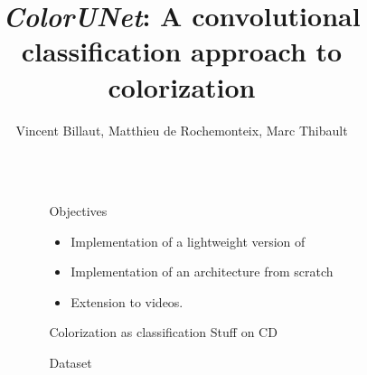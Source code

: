 \documentclass[final]{beamer}
\title{\textit{ColorUNet}: A convolutional classification approach to colorization} %
\author{Vincent Billaut, Matthieu de Rochemonteix, Marc Thibault} %
\institute{CS231n Final Project, 03/12/2018} %
\newlength{\sepwid}
\newlength{\onecolwid}
\begin{document}

\setlength{\belowcaptionskip}{2ex} %
\setlength\belowdisplayshortskip{2ex} %

\begin{frame}[t] %

\begin{columns}[t] %

\begin{column}{\sepwid}\end{column} %

\begin{column}{\onecolwid} %


\begin{alertblock}{Objectives}

\begin{itemize}
\item Implementation of a lightweight version of \cite{zhang2016colorful}
\item Implementation of an architecture from scratch
\item Extension to videos. 
\end{itemize}

\end{alertblock}


\begin{block}{Colorization as classification}
Stuff on CD

\end{block}

\begin{block}{Dataset}



\end{block}
\end{column}
\end{columns}
\end{frame}
\end{document}
